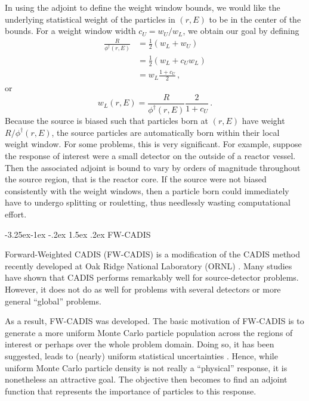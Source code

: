 \documentclass[letter,11pt]{article}
\makeatletter
\renewcommand\subsection{\@startsection{subsection}{2}{\z@}%
                                {-3.25ex\@plus -1ex \@minus -.2ex}%
                                {1.5ex \@plus .2ex}%
                                {\normalfont\itshape\bf}}
\makeatother
\begin{document}
In using the adjoint to define the weight window bounds, we would like the underlying statistical weight of the particles in $(r,E)$ to be in the center of the bounds.  For a weight window width $c_U = w_U/w_L$, we obtain our goal by defining
\begin{equation}
\begin{split}
  \frac{R}{\phi^\dag(r,E)} &= \frac{1}{2}(w_L + w_U) \\
                           &= \frac{1}{2}(w_L + c_U w_L) \\
                           &= w_L \frac{1+c_U}{2}\, ,
\end{split}
\end{equation}
or 
\begin{equation}
 w_L(r,E) = \frac{R}{\phi^\dag(r,E)} \frac{2}{1+c_U} \, .
\end{equation}
Because the source is biased such that particles born at $(r,E)$ have weight $R/\phi^\dag(r,E)$, the source particles are automatically born within their local weight window.  For some problems, this is very significant.  For example, suppose the response of interest were a small detector on the outside of a reactor vessel.  Then the associated adjoint is bound to vary by orders of magnitude throughout the source region, that is the reactor core.  If the source were not biased consistently with the weight windows, then a particle born could immediately have to undergo splitting or rouletting, thus needlessly wasting computational effort.

\subsection{FW-CADIS}

Forward-Weighted CADIS (FW-CADIS) is a modification of the CADIS method recently developed at Oak Ridge National Laboratory (ORNL) \cite{peplow2009sot,wagner2009fwc}.  Many studies have shown that CADIS performs remarkably well for source-detector problems.  However, it does not do as well for problems with several detectors or more general ``global'' problems.

As a result, FW-CADIS was developed.  The basic motivation of FW-CADIS is to generate a more uniform Monte Carlo particle population across the regions of interest or perhaps over the whole problem domain.  Doing so, it has been suggested, leads to (nearly) uniform statistical uncertainties \cite{cooper2001aww}.  Hence, while uniform Monte Carlo particle density is not really a ``physical'' response, it is nonetheless an attractive goal.  The objective then becomes to find an adjoint function that represents the importance of particles to this response.
\end{document}
